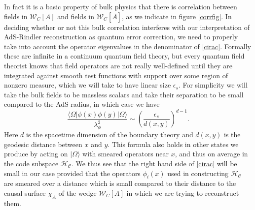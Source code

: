 \documentclass[12pt]{article}
\newcommand{\be}{\begin{equation}}
\newcommand{\ee}{\end{equation}}
\newcommand{\HC}{\mathcal{H}_{\mathcal{C}}}
\newcommand{\lan}{\langle}
\newcommand{\ran}{\rangle}
\newcommand{\W}{\mathcal{W}}
\newcommand{\ol}{\overline}
\begin{document}
In fact it is a basic property of bulk physics that there is correlation between fields in $\W_C[A]$ and fields in $\W_C[\ol{A}]$, as we indicate in figure \ref{corrfig}. In deciding whether or not this bulk correlation interferes with our interpretation of AdS-Rindler reconstruction as quantum error correction, we need to properly take into account the operator eigenvalues in the denominator of \eqref{cirac}.  Formally these are infinite in a continuum quantum field theory, but every quantum field theorist knows that field operators are not really well-defined until they are integrated against smooth test functions with support over some region of nonzero measure, which we will take to have linear size $\epsilon_s$.  For simplicity we will take the bulk fields to be massless scalars and take their separation to be small compared to the AdS radius, in which case we have
\be\label{bulkcorr}
\frac{\lan \Omega|\phi(x)\phi(y)|\Omega\ran}{\lambda_\phi^2}\sim\left(\frac{\epsilon_s}{d(x,y)}\right)^{d-1}.
\ee
Here $d$ is the spacetime dimension of the boundary theory and $d(x,y)$ is the geodesic distance between $x$ and $y$.  This formula also holds in other states we produce by acting on $|\Omega\ran$ with smeared operators near $x$, and thus on average in the code subspace $\HC$.  We thus see that the right hand side of \eqref{cirac} will be small in our case provided that the operators $\phi_i(x)$ used in constructing $\HC$ are smeared over a distance which is small compared to their distance to the causal surface $\chi_A$ of the wedge $\W_C[A]$ in which we are trying to reconstruct them.  
\end{document}
